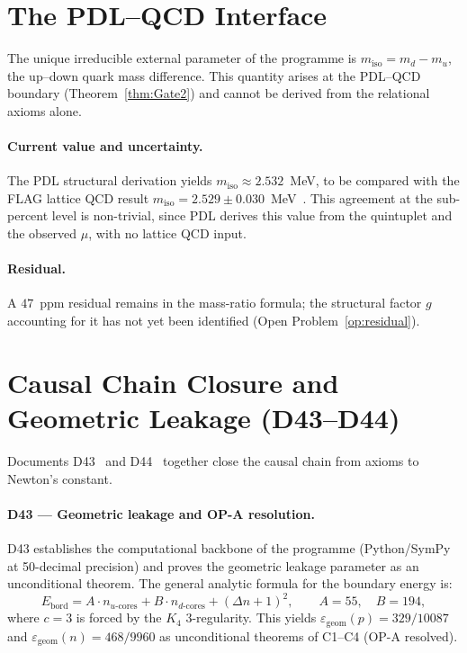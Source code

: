 \documentclass[11pt,a4paper]{article}
\theoremstyle{plain}
\theoremstyle{definition}
\theoremstyle{remark}
\begin{document}
\section{The PDL--QCD Interface}
\label{sec:QCD}
The unique irreducible external parameter of the programme is $m_{\mathrm{iso}}=m_d-m_u$, the up--down quark mass difference. This quantity arises at the PDL--QCD boundary (Theorem~\ref{thm:Gate2}) and cannot be derived from the relational axioms alone.

\paragraph{Current value and uncertainty.} The PDL structural derivation yields $m_{\mathrm{iso}}\approx 2.532$~MeV, to be compared with the FLAG lattice QCD result $m_{\mathrm{iso}}=2.529\pm0.030$~MeV~\cite{D30}. This agreement at the sub-percent level is non-trivial, since PDL derives this value from the quintuplet and the observed $\mu$, with no lattice QCD input.

\paragraph{Residual.} A $47$~ppm residual remains in the mass-ratio formula; the structural factor $g$ accounting for it has not yet been identified (Open Problem~\ref{op:residual}).

\section{Causal Chain Closure and Geometric Leakage (D43--D44)}
\label{sec:numerical}

Documents D43~\cite{D43} and D44~\cite{D44} together close the causal chain from axioms to Newton's constant.

\paragraph{D43 --- Geometric leakage and OP-A resolution.} D43 establishes the computational backbone of the programme (Python/SymPy at 50-decimal precision) and proves the geometric leakage parameter as an unconditional theorem. The general analytic formula for the boundary energy is:
\begin{equation}
  E_{\mathrm{bord}} = A \cdot n_{u\text{-cores}} + B \cdot n_{d\text{-cores}} + (\Delta n+1)^2,
  \qquad A = 55,\quad B = 194,
\end{equation}
where $c=3$ is forced by the $K_4$ 3-regularity. This yields $\varepsilon_{\mathrm{geom}}(p) = 329/10087$ and $\varepsilon_{\mathrm{geom}}(n) = 468/9960$ as unconditional theorems of C1--C4 (OP-A resolved).
\end{document}
